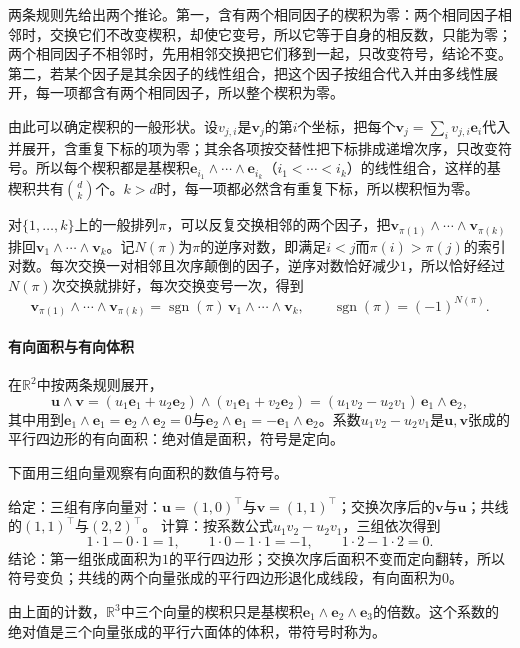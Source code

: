 两条规则先给出两个推论。第一，含有两个相同因子的楔积为零：两个相同因子相邻时，交换它们不改变楔积，却使它变号，所以它等于自身的相反数，只能为零；两个相同因子不相邻时，先用相邻交换把它们移到一起，只改变符号，结论不变。第二，若某个因子是其余因子的线性组合，把这个因子按组合代入并由多线性展开，每一项都含有两个相同因子，所以整个楔积为零。

由此可以确定楔积的一般形状。设$v_{j,i}$是$\bm v_j$的第$i$个坐标，把每个$\bm v_j=\sum_i v_{j,i}\bm e_i$代入并展开，含重复下标的项为零；其余各项按交替性把下标排成递增次序，只改变符号。所以每个楔积都是基楔积$\bm e_{i_1}\wedge\cdots\wedge\bm e_{i_k}$（$i_1<\cdots<i_k$）的线性组合，这样的基楔积共有$\binom{d}{k}$个。$k>d$时，每一项都必然含有重复下标，所以楔积恒为零。

对$\{1,\ldots,k\}$上的一般排列$\pi$，可以反复交换相邻的两个因子，把$\bm v_{\pi(1)}\wedge\cdots\wedge\bm v_{\pi(k)}$排回$\bm v_1\wedge\cdots\wedge\bm v_k$。记$N(\pi)$为$\pi$的逆序对数，即满足$i<j$而$\pi(i)>\pi(j)$的索引对数。每次交换一对相邻且次序颠倒的因子，逆序对数恰好减少$1$，所以恰好经过$N(\pi)$次交换就排好，每次交换变号一次，得到
\[
 \bm v_{\pi(1)}\wedge\cdots\wedge\bm v_{\pi(k)}
 =\operatorname{sgn}(\pi)\,\bm v_1\wedge\cdots\wedge\bm v_k,
 \qquad
 \operatorname{sgn}(\pi)=(-1)^{N(\pi)}.
\]

\paragraph{有向面积与有向体积}
在$\mathbb R^2$中按两条规则展开，
\[
 \bm u\wedge\bm v
 =(u_1\bm e_1+u_2\bm e_2)\wedge(v_1\bm e_1+v_2\bm e_2)
 =(u_1v_2-u_2v_1)\,\bm e_1\wedge\bm e_2,
\]
其中用到$\bm e_1\wedge\bm e_1=\bm e_2\wedge\bm e_2=0$与$\bm e_2\wedge\bm e_1=-\bm e_1\wedge\bm e_2$。系数$u_1v_2-u_2v_1$是$\bm u,\bm v$张成的平行四边形的有向面积：绝对值是面积，符号是定向。

下面用三组向量观察有向面积的数值与符号。
\begin{example}[平面上的有向面积]
\label{ex:ls-oriented-area}
给定：三组有序向量对：$\bm u=(1,0)^\top$与$\bm v=(1,1)^\top$；交换次序后的$\bm v$与$\bm u$；共线的$(1,1)^\top$与$(2,2)^\top$。
计算：按系数公式$u_1v_2-u_2v_1$，三组依次得到
\[
 1\cdot1-0\cdot1=1,\qquad
 1\cdot0-1\cdot1=-1,\qquad
 1\cdot2-1\cdot2=0.
\]
结论：第一组张成面积为$1$的平行四边形；交换次序后面积不变而定向翻转，所以符号变负；共线的两个向量张成的平行四边形退化成线段，有向面积为$0$。
\end{example}
由上面的计数，$\mathbb R^3$中三个向量的楔积只是基楔积$\bm e_1\wedge\bm e_2\wedge\bm e_3$的倍数。这个系数的绝对值是三个向量张成的平行六面体的体积，带符号时称为。

